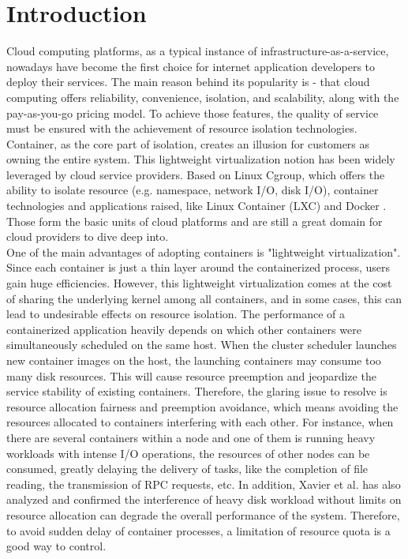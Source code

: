 \documentclass[10pt, conference,compsoc]{IEEEtran}
\begin{document}

\IEEEpeerreviewmaketitle

\section{Introduction}
Cloud computing platforms, as a typical instance of infrastructure-as-a-service, nowadays have become the first choice for internet application developers to deploy their services. The main reason behind its popularity is - that cloud computing offers reliability, convenience, isolation, and scalability, along with the pay-as-you-go pricing model. To achieve those features, the quality of service must be ensured with the achievement of resource isolation technologies.\\

Container, as the core part of isolation, creates an illusion for customers as owning the entire system. This lightweight virtualization notion has been widely leveraged by cloud service providers. Based on Linux Cgroup, which offers the ability to isolate resource (e.g. namespace, network I/O, disk I/O), container technologies and applications raised, like Linux Container (LXC) \cite{lxc} and Docker \cite{docker}. Those form the basic units of cloud platforms and are still a great domain for cloud providers to dive deep into. \\

One of the main advantages of adopting containers is "lightweight virtualization". Since each container is just a thin layer around the containerized process, users gain huge efficiencies. However, this lightweight virtualization comes at the cost of sharing the underlying kernel among all containers, and in some cases, this can lead to undesirable effects on resource isolation. The performance of a containerized application heavily depends on which other containers were simultaneously scheduled on the same host. When the cluster scheduler launches new container images on the host, the launching containers may consume too many disk resources. This will cause resource preemption and jeopardize the service stability of existing containers. Therefore, the glaring issue to resolve is resource allocation fairness and preemption avoidance, which means avoiding the resources allocated to containers interfering with each other. For instance, when there are several containers within a node and one of them is running heavy workloads with intense I/O operations, the resources of other nodes can be consumed, greatly delaying the delivery of tasks, like the completion of file reading, the transmission of RPC requests, etc. In addition, Xavier et al. \cite{Xavier2015API} has also analyzed and confirmed the interference of heavy disk workload without limits on resource allocation can degrade the overall performance of the system. Therefore, to avoid sudden delay of container processes, a limitation of resource quota is a good way to control.\\
\end{document}
